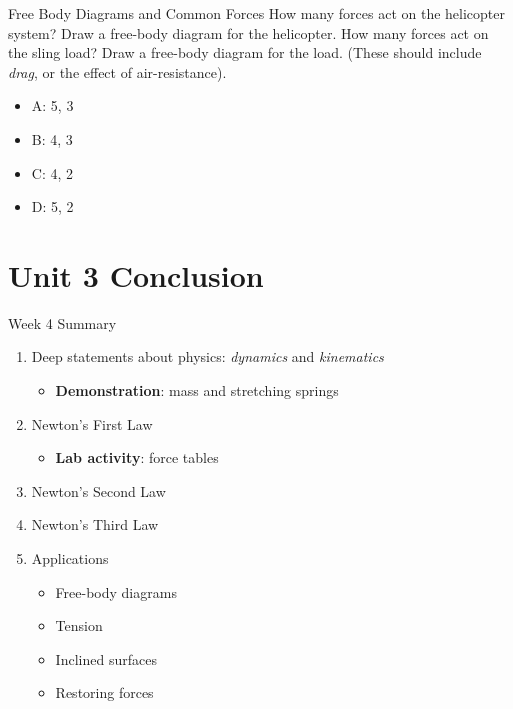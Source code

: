 \documentclass{beamer}
\begin{document}
\begin{frame}{Free Body Diagrams and Common Forces}
How many forces act on the helicopter system?  Draw a free-body diagram for the helicopter.  How many forces act on the sling load?  Draw a free-body diagram for the load.  (These should include \textit{drag}, or the effect of air-resistance).
\begin{itemize}
\item A: 5, 3
\item B: 4, 3
\item C: 4, 2
\item D: 5, 2
\end{itemize}
\end{frame}

\section{Unit 3 Conclusion}

\begin{frame}{Week 4 Summary}
\begin{enumerate}
\item Deep statements about physics: \textit{dynamics} and \textit{kinematics}
\begin{itemize}
\item \textbf{Demonstration}: mass and stretching springs
\end{itemize}
\item Newton's \alert{First Law}
\begin{itemize}
\item \textbf{Lab activity}: force tables
\end{itemize}
\item Newton's \alert{Second Law}
\item Newton's \alert{Third Law}
\item Applications
\begin{itemize}
\item Free-body diagrams
\item Tension
\item Inclined surfaces
\item Restoring forces
\end{itemize}
\end{enumerate}
\end{frame}
\end{document}
